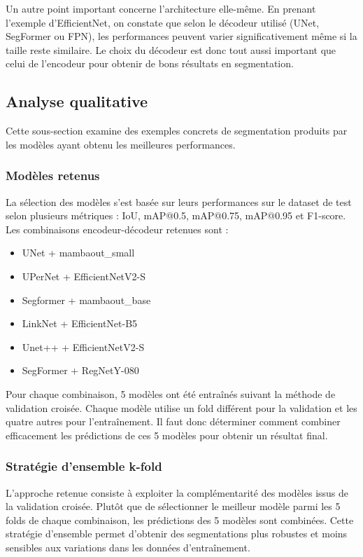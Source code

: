 Un autre point important concerne l'architecture elle-même. En prenant l'exemple d'EfficientNet, on constate que selon le décodeur utilisé (UNet, SegFormer ou FPN), les performances peuvent varier significativement même si la taille reste similaire. Le choix du décodeur est donc tout aussi important que celui de l'encodeur pour obtenir de bons résultats en segmentation.

\subsection{Analyse qualitative}
Cette sous-section examine des exemples concrets de segmentation produits par les modèles ayant obtenu les meilleures performances.

\subsubsection{Modèles retenus}
La sélection des modèles s'est basée sur leurs performances sur le dataset de test selon plusieurs métriques : IoU, mAP@0.5, mAP@0.75, mAP@0.95 et F1-score. Les combinaisons encodeur-décodeur retenues sont :
\begin{itemize}
    \item UNet + mambaout\_small
    \item UPerNet + EfficientNetV2-S
    \item Segformer + mambaout\_base
    \item LinkNet + EfficientNet-B5
    \item Unet++ + EfficientNetV2-S
    \item SegFormer + RegNetY-080
\end{itemize}

Pour chaque combinaison, 5 modèles ont été entraînés suivant la méthode de validation croisée. Chaque modèle utilise un fold différent pour la validation et les quatre autres pour l'entraînement. Il faut donc déterminer comment combiner efficacement les prédictions de ces 5 modèles pour obtenir un résultat final.

\subsubsection{Stratégie d'ensemble k-fold}

L'approche retenue consiste à exploiter la complémentarité des modèles issus de la validation croisée. Plutôt que de sélectionner le meilleur modèle parmi les 5 folds de chaque combinaison, les prédictions des 5 modèles sont combinées. Cette stratégie d'ensemble permet d'obtenir des segmentations plus robustes et moins sensibles aux variations dans les données d'entraînement.

